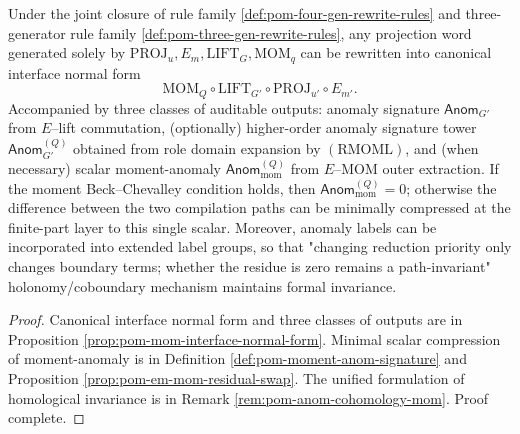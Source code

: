 \begin{conclusion}\label{con:xi-terminal-projword-normal-form-mom-twist-anom}
Under the joint closure of rule family \ref{def:pom-four-gen-rewrite-rules} and three-generator rule family \ref{def:pom-three-gen-rewrite-rules}, any projection word generated solely by
\(\mathrm{PROJ}_u,E_m,\mathrm{LIFT}_G,\mathrm{MOM}_q\)
can be rewritten into canonical interface normal form
\[
\mathrm{MOM}_Q\circ \mathrm{LIFT}_{G'}\circ \mathrm{PROJ}_{u'}\circ E_{m'}.
\]
Accompanied by three classes of auditable outputs: anomaly signature \(\mathsf{Anom}_{G'}\) from \(E\)--lift commutation, (optionally) higher-order anomaly signature tower \(\mathsf{Anom}^{(Q)}_{G'}\) obtained from role domain expansion by \((\mathrm{RMOML})\), and (when necessary) scalar moment-anomaly \(\mathsf{Anom}^{(Q)}_{\mathrm{mom}}\) from \(E\)--\(\mathrm{MOM}\) outer extraction.
If the moment Beck--Chevalley condition holds, then \(\mathsf{Anom}^{(Q)}_{\mathrm{mom}}=0\); otherwise the difference between the two compilation paths can be minimally compressed at the finite-part layer to this single scalar.
Moreover, anomaly labels can be incorporated into extended label groups, so that "changing reduction priority only changes boundary terms; whether the residue is zero remains a path-invariant" holonomy/coboundary mechanism maintains formal invariance.
\end{conclusion}
\begin{proof}[Proof]
Canonical interface normal form and three classes of outputs are in Proposition \ref{prop:pom-mom-interface-normal-form}.
Minimal scalar compression of moment-anomaly is in Definition \ref{def:pom-moment-anom-signature} and Proposition \ref{prop:pom-em-mom-residual-swap}.
The unified formulation of homological invariance is in Remark \ref{rem:pom-anom-cohomology-mom}. Proof complete.
\end{proof}
